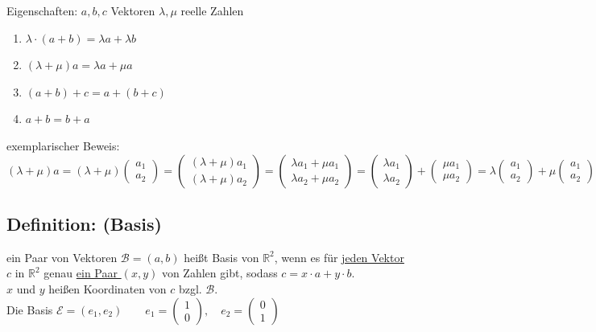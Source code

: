 Eigenschaften: $a,b,c$ Vektoren $\lambda, \mu $ reelle Zahlen
\begin{enumerate}
\item $\lambda \cdot (a+b) = \lambda a + \lambda b$
\item $(\lambda + \mu) a = \lambda a + \mu a$
\item $(a+b)+c=a+(b+c)$
\item $a+b = b+a$
\end{enumerate}
exemplarischer Beweis:\\
$(\lambda +\mu) a = (\lambda + \mu)\begin{pmatrix}a_{1} \\ a_{2} \end{pmatrix} = \begin{pmatrix} (\lambda + \mu)  a_{1} \\ (\lambda + \mu)  a_{2}\end{pmatrix}=\begin{pmatrix}\lambda  a_{1}+\mu a_{1} \\ \lambda  a_{2} + \mu  a_{2} \end{pmatrix}=\begin{pmatrix} \lambda  a_{1} \\ \lambda  a_{2}\end{pmatrix} + \begin{pmatrix} \mu  a_{1} \\ \mu  a_{2}\end{pmatrix} = \lambda  \begin{pmatrix}a_{1} \\ a_{2}\end{pmatrix} + \mu \begin{pmatrix}a_{1} \\ a_{2}\end{pmatrix} =\lambda a + \mu a$
%
%
%
\subsection{Definition: (Basis)}
ein Paar von Vektoren $\mathcal{B}=(a,b)$ heißt Basis von $\mathbb{R}^{2}$, wenn es für \underline{jeden Vektor} $c$ in $\mathbb{R}^{2}$ genau \underline{ein Paar $(x,y)$} von Zahlen gibt, sodass $c=x\cdot a + y \cdot b$. \\
$x$ und $y$ heißen Koordinaten von $c$ bzgl. $\mathcal{B}$.\\
Die Basis $\mathcal{E}=(e_{1},e_{2}) \qquad e_{1}=\begin{pmatrix} 1 \\ 0 \end{pmatrix}, \quad e_{2} = \begin{pmatrix} 0 \\ 1 \end{pmatrix}$\\
